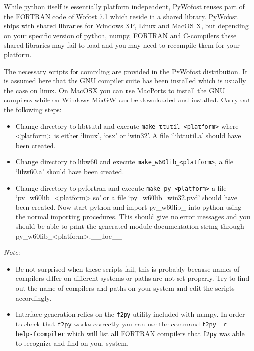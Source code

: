\documentclass[12pt]{article}
\begin{document}
While python itself is essentially platform independent, PyWofost reuses part of the FORTRAN code of Wofost 7.1 which reside in a shared library. PyWofost ships with shared libraries for Windows XP, Linux and MacOS X, but depending on your specific version of python, numpy, FORTRAN and C-compilers these shared libraries may fail to load and you may need to recompile them for your platform.

The necessary scripts for compiling are provided in the PyWofost distribution. It is assumed here that the GNU compiler suite has been installed which is usually the case on linux. On MacOSX you can use MacPorts to install the GNU compilers while on Windows MinGW can be downloaded and installed. Carry out the following steps:
\begin{itemize}
		\item Change directory to libttutil and execute \texttt{make\_ttutil\_<platform>} where <platform> is either `linux', `osx' or `win32'. A file `libttutil.a' should have been created.
		\item Change directory to libw60 and execute \texttt{make\_w60lib\_<platform>}, a file\\ `libw60.a' should have been created.
		\item Change directory to pyfortran and execute \texttt{make\_py\_<platform>} a  file\\ `py\_w60lib\_<platform>.so' or a file `py\_w60lib\_win32.pyd' should have been created. Now start python and import py\_w60lib\_<your platform> into python using the normal importing procedures. This should give no error messages and you should be able to print the generated module documentation string through py\_w60lib\_<platform>.\_\_doc\_\_
\end{itemize}

\emph{Note}: 
\begin{itemize}
	\item Be not surprised when these scripts fail, this is probably because names of compilers differ on different systems or paths are not set properly. Try to find out the name of compilers and paths on your system and edit the scripts accordingly.
  \item Interface generation relies on the \texttt{f2py} utility included with numpy. In order to check that \texttt{f2py} works correctly you can use the command \texttt{f2py -c ---help-fcompiler} which will list all FORTRAN compilers that \texttt{f2py} was able to recognize and find on your system.
\end{itemize}
\end{document}
